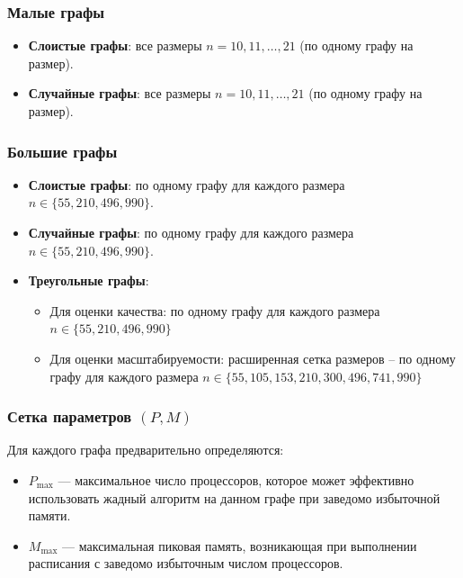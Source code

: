 \subsubsection*{Малые графы}

\begin{itemize}
	\item \textbf{Слоистые графы}: все размеры $n = 10, 11, \dots, 21$ (по одному графу на размер).
	\item \textbf{Случайные графы}: все размеры $n = 10, 11, \dots, 21$ (по одному графу на размер).
\end{itemize}

\subsubsection*{Большие графы}

\begin{itemize}
	\item \textbf{Слоистые графы}: по одному графу для каждого размера $n \in \{55, 210, 496, 990\}$.
	\item \textbf{Случайные графы}: по одному графу для каждого размера $n \in \{55, 210, 496, 990\}$.
	\item \textbf{Треугольные графы}:
	\begin{itemize}
		\item Для оценки качества: по одному графу для каждого размера\\ $n \in \{55, 210, 496, 990\}$
		\item Для оценки масштабируемости: расширенная сетка размеров -- по одному графу для каждого размера $n \in \{55, 105, 153, 210, 300, 496, 741, 990\}$ 
	\end{itemize}
\end{itemize}

\subsubsection*{Сетка параметров $(P, M)$}

Для каждого графа предварительно определяются:
\begin{itemize}
	\item $P_{\max}$ — максимальное число процессоров, которое может эффективно использовать жадный алгоритм на данном графе при заведомо избыточной памяти.
	\item $M_{\max}$ — максимальная пиковая память, возникающая при выполнении расписания с заведомо избыточным числом процессоров.
\end{itemize}

